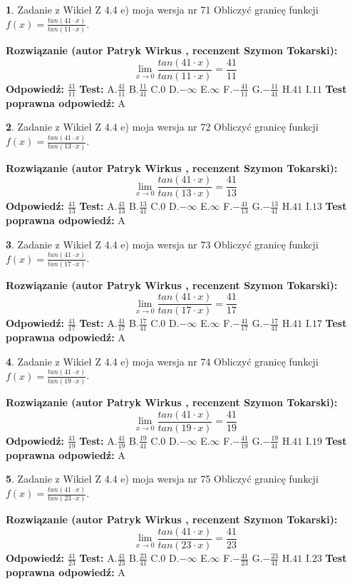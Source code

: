 \documentclass[12pt, a4paper]{article}
\theoremstyle{definition} %
\newtheorem{zad}{}
\newcommand{\zadStart}[1]{\begin{zad}#1\newline}
\newcommand{\zadStop}{\end{zad}}
\newcommand{\rozwStart}[2]{\noindent \textbf{Rozwiązanie (autor #1 , recenzent #2): }\newline}
\newcommand{\rozwStop}{\newline}
\newcommand{\odpStart}{\noindent \textbf{Odpowiedź:}\newline}
\newcommand{\odpStop}{\newline}
\newcommand{\testStart}{\noindent \textbf{Test:}\newline}
\newcommand{\testStop}{\newline}
\newcommand{\kluczStart}{\noindent \textbf{Test poprawna odpowiedź:}\newline}
\newcommand{\kluczStop}{\newline}
\begin{document}
\zadStart{Zadanie z Wikieł Z 4.4 e) moja wersja nr 71}
Obliczyć granicę funkcji $f(x)=\frac{tan(41\cdot x)}{tan(11\cdot x)}$.
\zadStop
\rozwStart{Patryk Wirkus}{Szymon Tokarski}
$$\lim\limits_{x\to 0}\frac{tan(41\cdot x)}{tan(11\cdot x)}=
\frac{41}{11}$$
\rozwStop
\odpStart
$\frac{41}{11}$
\odpStop
\testStart
A.$\frac{41}{11}$
B.$\frac{11}{41}$
C.$0$
D.$-\infty$
E.$\infty$
F.$-\frac{41}{11}$
G.$-\frac{11}{41}$
H.$41$
I.$11$
\testStop
\kluczStart
A
\kluczStop



\zadStart{Zadanie z Wikieł Z 4.4 e) moja wersja nr 72}
Obliczyć granicę funkcji $f(x)=\frac{tan(41\cdot x)}{tan(13\cdot x)}$.
\zadStop
\rozwStart{Patryk Wirkus}{Szymon Tokarski}
$$\lim\limits_{x\to 0}\frac{tan(41\cdot x)}{tan(13\cdot x)}=
\frac{41}{13}$$
\rozwStop
\odpStart
$\frac{41}{13}$
\odpStop
\testStart
A.$\frac{41}{13}$
B.$\frac{13}{41}$
C.$0$
D.$-\infty$
E.$\infty$
F.$-\frac{41}{13}$
G.$-\frac{13}{41}$
H.$41$
I.$13$
\testStop
\kluczStart
A
\kluczStop



\zadStart{Zadanie z Wikieł Z 4.4 e) moja wersja nr 73}
Obliczyć granicę funkcji $f(x)=\frac{tan(41\cdot x)}{tan(17\cdot x)}$.
\zadStop
\rozwStart{Patryk Wirkus}{Szymon Tokarski}
$$\lim\limits_{x\to 0}\frac{tan(41\cdot x)}{tan(17\cdot x)}=
\frac{41}{17}$$
\rozwStop
\odpStart
$\frac{41}{17}$
\odpStop
\testStart
A.$\frac{41}{17}$
B.$\frac{17}{41}$
C.$0$
D.$-\infty$
E.$\infty$
F.$-\frac{41}{17}$
G.$-\frac{17}{41}$
H.$41$
I.$17$
\testStop
\kluczStart
A
\kluczStop



\zadStart{Zadanie z Wikieł Z 4.4 e) moja wersja nr 74}
Obliczyć granicę funkcji $f(x)=\frac{tan(41\cdot x)}{tan(19\cdot x)}$.
\zadStop
\rozwStart{Patryk Wirkus}{Szymon Tokarski}
$$\lim\limits_{x\to 0}\frac{tan(41\cdot x)}{tan(19\cdot x)}=
\frac{41}{19}$$
\rozwStop
\odpStart
$\frac{41}{19}$
\odpStop
\testStart
A.$\frac{41}{19}$
B.$\frac{19}{41}$
C.$0$
D.$-\infty$
E.$\infty$
F.$-\frac{41}{19}$
G.$-\frac{19}{41}$
H.$41$
I.$19$
\testStop
\kluczStart
A
\kluczStop



\zadStart{Zadanie z Wikieł Z 4.4 e) moja wersja nr 75}
Obliczyć granicę funkcji $f(x)=\frac{tan(41\cdot x)}{tan(23\cdot x)}$.
\zadStop
\rozwStart{Patryk Wirkus}{Szymon Tokarski}
$$\lim\limits_{x\to 0}\frac{tan(41\cdot x)}{tan(23\cdot x)}=
\frac{41}{23}$$
\rozwStop
\odpStart
$\frac{41}{23}$
\odpStop
\testStart
A.$\frac{41}{23}$
B.$\frac{23}{41}$
C.$0$
D.$-\infty$
E.$\infty$
F.$-\frac{41}{23}$
G.$-\frac{23}{41}$
H.$41$
I.$23$
\testStop
\kluczStart
A
\kluczStop
\end{document}

